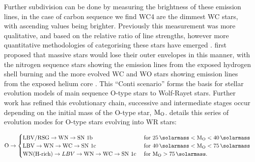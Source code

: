 \noindent
Further subdivision can be done by measuring the brightness of these emission lines, in the case of carbon sequence we find WC4 are the dimmest WC stars, with ascending values being brighter.
Previously this measurement was more qualitative, and based on the relative ratio of line strengths, however more quantitative methodologies of categorising these stars have emerged
\parencite{crowtherQuantitativeClassificationWC1998}.
\textcite{contiRelationshipWRStars1975} first proposed that massive stars would lose their outer envelopes in this manner, with the nitrogen sequence stars showing the emission lines from the exposed hydrogen shell burning and the more evolved WC and WO stars showing emission lines from the exposed helium core
\parencite{neugentWolfRayetContent2019,oswaltPlanetsStarsStellar2013}.
This ``Conti scenario'' forms the basis for stellar evolution models of main sequence O-type stars to Wolf-Rayet stars.
Further work has refined this evolutionary chain, successive and intermediate stages occur depending on the initial mass of the O-type star, $\text{M}_\text{O}$.
\textcite{crowther_physical_2007} details this series of evolution modes for O-type stars evolving into WR stars:

\begin{equation}
  \text{O} \rightarrow
  \begin{cases}
    \text{LBV/RSG} \rightarrow \text{WN} \rightarrow \text{SN 1b} & \text{ for } \SI{25}{\solarmass} < \mass\rms{O} < \SI{40}{\solarmass} \\
    \text{LBV} \rightarrow \text{WN} \rightarrow \text{WC} \rightarrow \text{SN 1c} & \text{ for } \SI{40}{\solarmass} < \mass\rms{O} < \SI{75}{\solarmass} \\ 
    \text{WN(H-rich)} \rightarrow LBV \rightarrow \text{WN} \rightarrow \text{WC} \rightarrow \text{SN 1c} & \text{ for } \mass\rms{O} > \SI{75}{\solarmass} .
  \end{cases}
\end{equation}

